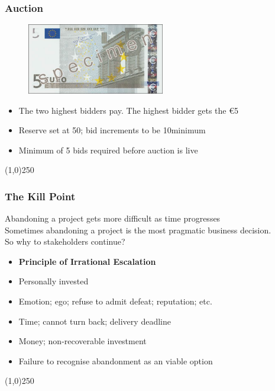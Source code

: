 \begin{frame}
\frametitle{Auction}
\begin{figure}
	\centering
		\includegraphics[width = 6cm]{images/5euro.jpg}
	\label{fig:5euro}
\end{figure}
\begin{itemize}
	\item The two highest bidders pay.  The highest bidder gets the \euro5\\
	\item Reserve set at 50\textcent; bid increments to be 10\textcent minimum\\
	\item Minimum of 5 bids required before auction is live\\
\end{itemize}
\end{frame}
\begin{center}\line(1,0){250}\end{center}



\begin{frame}
\frametitle{The Kill Point}
Abandoning a project gets more difficult as time progresses\\
Sometimes abandoning a project is the most pragmatic business decision.\\
So why to stakeholders continue?\\
\begin{itemize}
\item \textbf{Principle of Irrational Escalation}
\item Personally invested
\item Emotion; ego; refuse to admit defeat; reputation; etc.
\item Time; cannot turn back; delivery deadline
\item Money; non-recoverable investment
\item Failure to recognise abandonment as an viable option
\end{itemize}
\end{frame}
\begin{center}\line(1,0){250}\end{center}



